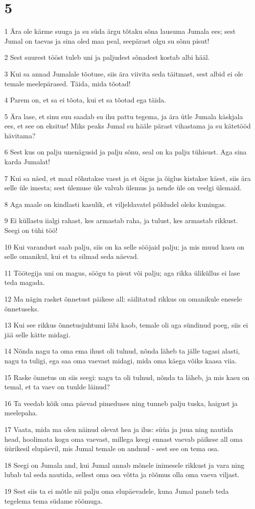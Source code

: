 \chapter{5}

\par 1 Ära ole kärme suuga ja su süda ärgu tõtaku sõna lausuma Jumala ees; sest Jumal on taevas ja sina oled maa peal, seepärast olgu su sõnu pisut!
\par 2 Sest suurest tööst tuleb uni ja paljudest sõnadest kostab albi hääl.
\par 3 Kui sa annad Jumalale tõotuse, siis ära viivita seda täitmast, sest albid ei ole temale meelepärased. Täida, mida tõotad!
\par 4 Parem on, et sa ei tõota, kui et sa tõotad ega täida.
\par 5 Ära lase, et sinu suu saadab su ihu pattu tegema, ja ära ütle Jumala käskjala ees, et see on eksitus! Miks peaks Jumal su hääle pärast vihastama ja su kätetööd hävitama?
\par 6 Sest kus on palju unenägusid ja palju sõnu, seal on ka palju tühisust. Aga sina karda Jumalat!
\par 7 Kui sa näed, et maal rõhutakse vaest ja et õigus ja õiglus kistakse käest, siis ära selle üle imesta; sest ülemuse üle valvab ülemus ja nende üle on veelgi ülemaid.
\par 8 Aga maale on kindlasti kasulik, et viljeldavatel põldudel oleks kuningas.
\par 9 Ei küllastu iialgi rahast, kes armastab raha, ja tulust, kes armastab rikkust. Seegi on tühi töö!
\par 10 Kui varandust saab palju, siis on ka selle sööjaid palju; ja mis muud kasu on selle omanikul, kui et ta silmad seda näevad.
\par 11 Töötegija uni on magus, söögu ta pisut või palju; aga rikka üliküllus ei lase teda magada.
\par 12 Ma nägin rasket õnnetust päikese all: säilitatud rikkus on omanikule enesele õnnetuseks.
\par 13 Kui see rikkus õnnetusjuhtumi läbi kaob, temale oli aga sündinud poeg, siis ei jää selle kätte midagi.
\par 14 Nõnda nagu ta oma ema ihust oli tulnud, nõnda läheb ta jälle tagasi alasti, nagu ta tuligi, ega saa oma vaevast midagi, mida oma käega võiks kaasa viia.
\par 15 Raske õnnetus on siis seegi: nagu ta oli tulnud, nõnda ta läheb, ja mis kasu on temal, et ta vaev on tuulde läinud?
\par 16 Ta veedab kõik oma päevad pimeduses ning tunneb palju tuska, haigust ja meelepaha.
\par 17 Vaata, mida ma olen näinud olevat hea ja ilus: süüa ja juua ning nautida head, hoolimata kogu oma vaevast, millega keegi ennast vaevab päikese all oma üürikesil elupäevil, mis Jumal temale on andnud - sest see on tema osa.
\par 18 Seegi on Jumala and, kui Jumal annab mõnele inimesele rikkust ja vara ning lubab tal seda nautida, sellest oma osa võtta ja rõõmus olla oma vaeva viljast.
\par 19 Sest siis ta ei mõtle nii palju oma elupäevadele, kuna Jumal paneb teda tegelema tema südame rõõmuga.

